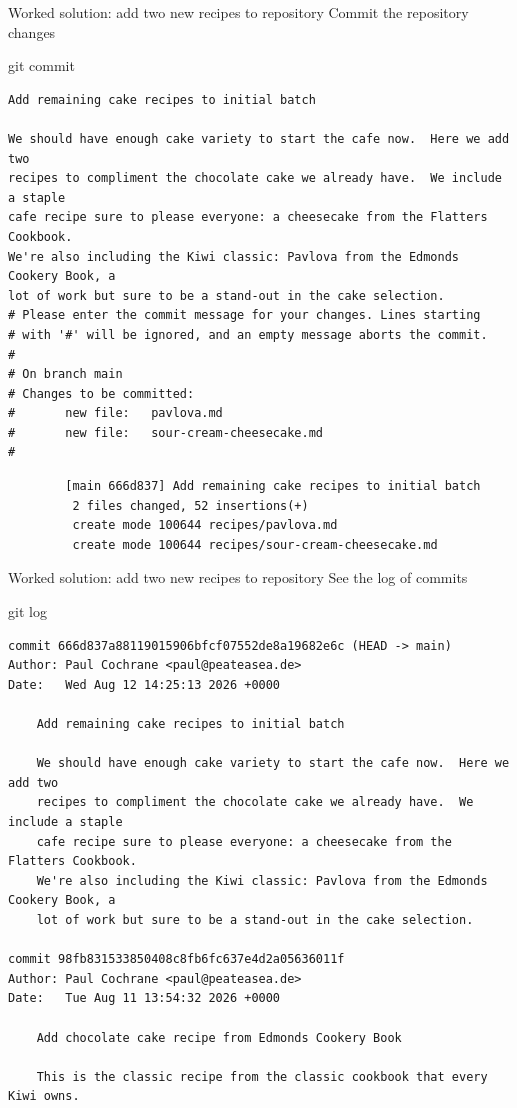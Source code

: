 \begin{frame}[fragile]{Worked solution: add two new recipes to repository}
    Commit the repository changes
    \begin{shellcode}
        git commit
    \end{shellcode}
    \begin{verbatim}
Add remaining cake recipes to initial batch

We should have enough cake variety to start the cafe now.  Here we add two
recipes to compliment the chocolate cake we already have.  We include a staple
cafe recipe sure to please everyone: a cheesecake from the Flatters Cookbook.
We're also including the Kiwi classic: Pavlova from the Edmonds Cookery Book, a
lot of work but sure to be a stand-out in the cake selection.
# Please enter the commit message for your changes. Lines starting
# with '#' will be ignored, and an empty message aborts the commit.
#
# On branch main
# Changes to be committed:
#       new file:   pavlova.md
#       new file:   sour-cream-cheesecake.md
#
    \end{verbatim}
    \begin{verbatim}
        [main 666d837] Add remaining cake recipes to initial batch
         2 files changed, 52 insertions(+)
         create mode 100644 recipes/pavlova.md
         create mode 100644 recipes/sour-cream-cheesecake.md
    \end{verbatim}
\end{frame}

\begin{frame}[fragile]{Worked solution: add two new recipes to repository}
    See the log of commits
    \begin{shellcode}
        git log
    \end{shellcode}
    \begin{verbatim}
commit 666d837a88119015906bfcf07552de8a19682e6c (HEAD -> main)
Author: Paul Cochrane <paul@peateasea.de>
Date:   Wed Aug 12 14:25:13 2026 +0000

    Add remaining cake recipes to initial batch

    We should have enough cake variety to start the cafe now.  Here we add two
    recipes to compliment the chocolate cake we already have.  We include a staple
    cafe recipe sure to please everyone: a cheesecake from the Flatters Cookbook.
    We're also including the Kiwi classic: Pavlova from the Edmonds Cookery Book, a
    lot of work but sure to be a stand-out in the cake selection.

commit 98fb831533850408c8fb6fc637e4d2a05636011f
Author: Paul Cochrane <paul@peateasea.de>
Date:   Tue Aug 11 13:54:32 2026 +0000

    Add chocolate cake recipe from Edmonds Cookery Book

    This is the classic recipe from the classic cookbook that every Kiwi owns.
    \end{verbatim}
\end{frame}

